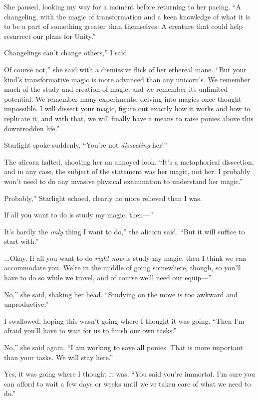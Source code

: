 She paused, looking my way for a moment before returning to her pacing. “A changeling, with the magic of transformation and a keen knowledge of what it is to be a part of something greater than themselves. A creature that could help resurrect our plans for Unity.”

\leavevmode{}Changelings can’t change others,” I said.

\leavevmode{}Of course not,” she said with a dismissive flick of her ethereal mane. “But your kind’s transformative magic is more advanced than any unicorn’s. We remember much of the study and creation of magic, and we remember its unlimited potential. We remember many experiments, delving into magics once thought impossible. I will dissect your magic, figure out exactly how it works and how to replicate it, and with that, we will finally have a means to raise ponies above this downtrodden life.”

Starlight spoke suddenly. “You’re not \textit{dissecting} her!”

The alicorn halted, shooting her an annoyed look. “It’s a metaphorical dissection, and in any case, the subject of the statement was her magic, not her. I probably won’t need to do any invasive physical examination to understand her magic.”

\leavevmode{}Probably,” Starlight echoed, clearly no more relieved than I was.

\leavevmode{}If all you want to do is study my magic, then—”

\leavevmode{}It’s hardly the \textit{only} thing I want to do,” the alicorn said. “But it will suffice to start with.”

\leavevmode{}...Okay. If all you want to do \textit{right now} is study my magic, then I think we can accommodate you. We’re in the middle of going somewhere, though, so you’ll have to do so while we travel, and of course we’ll need our equip—”

\leavevmode{}No,” she said, shaking her head. “Studying on the move is too awkward and unproductive.”

I swallowed, hoping this wasn’t going where I thought it was going. “Then I’m afraid you’ll have to wait for us to finish our own tasks.”

\leavevmode{}No,” she said again. “I am working to save all ponies. That is more important than your tasks. We will stay here.”

Yes, it was going where I thought it was. “You said you’re immortal. I’m sure you can afford to wait a few days or weeks until we’ve taken care of what we need to do.”

